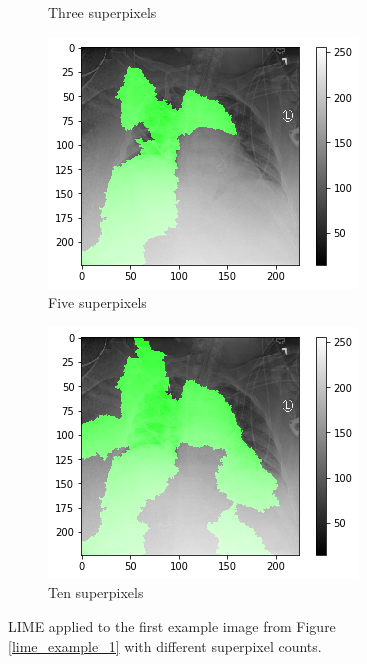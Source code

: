 \begin{figure}[H]
\begin{subfigure}[b]{.4\textwidth}
        \caption{Three superpixels}
    \end{subfigure}
    \begin{subfigure}[b]{.4\textwidth}
        \centering
        \vspace{0.5cm}
        \includegraphics[width=\linewidth]{chapters/03_classification/images/lime_sp_5.png}
        \caption{Five superpixels}
    \end{subfigure}\hspace{1cm}%
    \begin{subfigure}[b]{.4\textwidth}
        \centering
        \includegraphics[width=\linewidth]{chapters/03_classification/images/lime_sp_10.png}
        \caption{Ten superpixels}
    \end{subfigure}
    \caption{LIME applied to the first example image from Figure \ref{lime_example_1} with different superpixel counts.}
    \label{lime_superpixel_count}
\end{figure}

